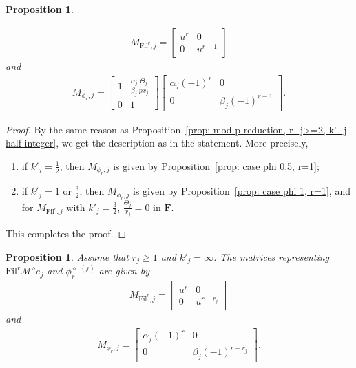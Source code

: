 \documentclass[11pt]{amsart}
\theoremstyle{definition}
\numberwithin{equation}{subsection}
\theoremstyle{plain}
\theoremstyle{plain}
\theoremstyle{plain}
\theoremstyle{plain}
\theoremstyle{plain}
\theoremstyle{plain}
\theoremstyle{plain}
\theoremstyle{plain}
\newtheorem{prop}[equation]{Proposition}
\theoremstyle{plain}
\theoremstyle{plain}
\theoremstyle{plain}
\theoremstyle{plain}
\theoremstyle{definition}
\theoremstyle{definition}
\theoremstyle{definition}
\theoremstyle{remark}
\renewcommand{\(}{\textup{(}}
\renewcommand{\)}{\textup{)}}
\newcommand{\F}{\mathbf{F}}
\newcommand{\cM}{\mathcal{M}}
\newcommand{\Fil}{\mathrm{Fil}}
\begin{document}
\begin{prop}
\begin{enumerate}[leftmargin=*]
    \begin{align*}
    M_{\Fil^r,j}
        =
        \begin{bmatrix}
            u^r & 0 \\
            0 & u^{r-1}
        \end{bmatrix}
    \end{align*}
    and
    \begin{align*}
    M_{\phi_r,j}
        =
        \begin{bmatrix}
          1 & \frac{\alpha_j}{\beta_j}\frac{\Theta_j}{px_j} \\
          0 & 1
        \end{bmatrix}
        \begin{bmatrix}
            \alpha_j (-1)^r & 0 \\
            0 & \beta_j (-1)^{r-1}
        \end{bmatrix}.
    \end{align*}
\end{enumerate}
\end{prop}

\begin{proof}
By the same reason as Proposition~\ref{prop: mod p reduction, r_j>=2, k'_j half integer}, we get the description as in the statement. More precisely,
\begin{enumerate}[leftmargin=*]
  \item if $k'_j=\frac{1}{2}$, then $M_{\phi_r,j}$ is given by Proposition~\ref{prop: case phi 0.5, r=1};
  \item if $k'_j=1$ or $\frac{3}{2}$, then $M_{\phi_r,j}$ is given by Proposition~\ref{prop: case phi 1, r=1}, and for $M_{\Fil^r,j}$ with $k'_j=\frac{3}{2}$, $\frac{\Theta_j}{x_j}=0$ in $\F$.
\end{enumerate}
This completes the proof.
\end{proof}

\begin{prop}\label{prop: mod p reduction, k'_j=infty}
Assume that $r_j\geq 1$ and $k'_j=\infty$. The matrices representing $\Fil^r\cM^\diamond e_j$ and $\phi_r^{\diamond,(j)}$ are given by
\begin{align*}
M_{\Fil^r,j}
    =
    \begin{bmatrix}
        u^r & 0 \\
        0 & u^{r-r_j}
    \end{bmatrix}
\end{align*}
and
\begin{align*}
M_{\phi_r,j}
    =
    \begin{bmatrix}
        \alpha_j (-1)^r & 0 \\
        0 & \beta_j (-1)^{r-r_j}
    \end{bmatrix}.
\end{align*}
\end{prop}
\end{document}
